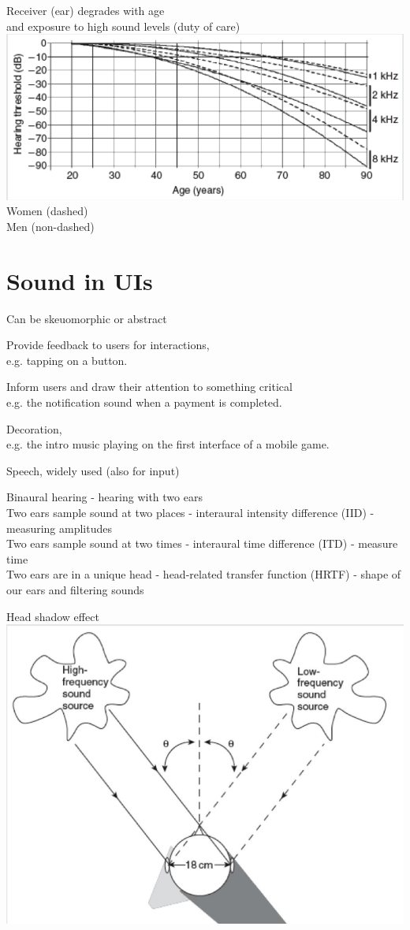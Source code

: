 \documentclass[]{project_plan}
\begin{document}
Receiver (ear) degrades with age\\
and exposure to high sound levels (duty of care)\\
\includegraphics[width=\linewidth]{degrade_hearing_age.png}
Women (dashed)\\
Men (non-dashed)

\newpage

\section{Sound in UIs}
Can be skeuomorphic or abstract

Provide feedback to users for interactions,\\
e.g. tapping on a button.

Inform users and draw their attention to something critical\\
e.g. the notification sound when a payment is completed.

Decoration,\\
e.g. the intro music playing on the first interface of a mobile game.

Speech, widely used (also for input)

Binaural hearing - hearing with two ears\\
Two ears sample sound at two places - interaural intensity difference (IID) - measuring amplitudes\\
Two ears sample sound at two times - interaural time difference (ITD) - measure time\\
Two ears are in a unique head - head-related transfer function (HRTF) - shape of our ears and filtering sounds

Head shadow effect\\
\includegraphics[width=\linewidth]{head_shadow_effect.png}
\end{document}
